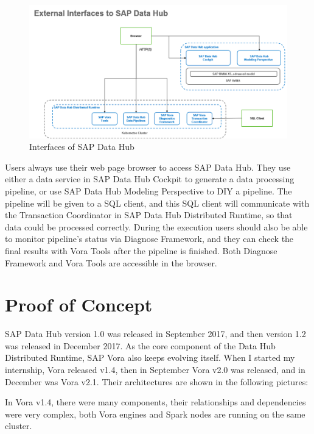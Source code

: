 \documentclass[article,colorback,accentcolor=tud4c]{tudreport}
\begin{document}
\begin{figure}[!h]
	\centering
	\includegraphics[width=\textwidth]{interfaces}
	\caption{Interfaces of SAP Data Hub}
\end{figure}

Users always use their web page browser to access SAP Data Hub. They use either a data service in SAP Data Hub Cockpit to generate a data processing pipeline, or use SAP Data Hub Modeling Perspective to DIY a pipeline. The pipeline will be given to a SQL client, and this SQL client will communicate with the Transaction Coordinator in SAP Data Hub Distributed Runtime, so that data could be processed correctly. During the execution users should also be able to monitor pipeline's status via Diagnose Framework, and they can check the final results with Vora Tools after the pipeline is finished. Both Diagnose Framework and Vora Tools are accessible in the browser.

\newpage

\section{Proof of Concept}
\setcounter{table}{0}
\setcounter{figure}{0}

SAP Data Hub version 1.0 was released in September 2017, and then version 1.2 was released in December 2017. As the core component of the Data Hub Distributed Runtime, SAP Vora also keeps evolving itself. When I started my internship, Vora released v1.4, then in September Vora v2.0 was released, and in December was Vora v2.1. Their architectures are shown in the following pictures:

In Vora v1.4, there were many components, their relationships and dependencies were very complex, both Vora engines and Spark nodes are running on the same cluster.
\end{document}
